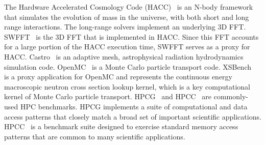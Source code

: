 %
The Hardware Accelerated Cosmology Code (HACC)~\cite{HACC} is an 
N-body framework that simulates the evolution of mass in the universe, 
with both short and long range interactions.
The long-range solvers implement an underlying 3D FFT.
SWFFT~\cite{ECPProxySuite1} is the 3D FFT that is %
implemented in HACC.  Since this FFT accounts for a large portion 
of the HACC execution time, SWFFT serves as a proxy for HACC.  
%
Castro~\cite{Castro} is an adaptive mesh, astrophysical radiation
hydrodynamics simulation code.  %
%
OpenMC~\cite{OpenMC} is a Monte Carlo particle transport code.  
XSBench~\cite{XSBench} is a proxy application for OpenMC and represents the
continuous energy macroscopic neutron cross section lookup kernel, which is
a key computational kernel of Monte Carlo particle transport. 
HPCG~\cite{hpcg} and HPCC~\cite{hpcc} are commonly-used HPC
benchmarks.  HPCG implements a suite of computational and data access 
patterns that closely match a broad set of important scientific
applications. HPCC~\cite{hpcc} is a benchmark suite designed
to exercise standard memory access patterns that are common
to many scientific applications. 

